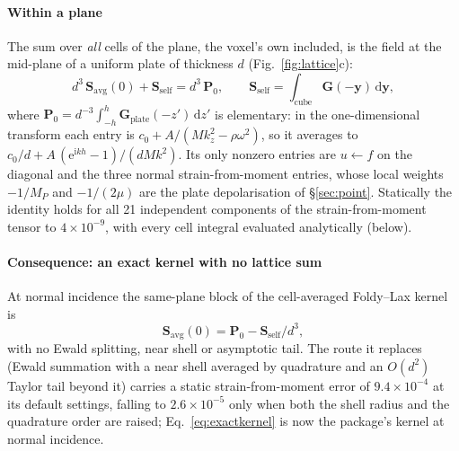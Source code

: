 \documentclass[preprint,review,12pt]{elsarticle}
\newcommand{\bS}{\mathbf{S}}
\newcommand{\bP}{\mathbf{P}}
\newcommand{\bG}{\mathbf{G}}
\newcommand{\dd}{\mathrm{d}}
\begin{document}
\paragraph{Within a plane} The sum over \emph{all} cells of the plane, the voxel's own included,
is the field at the mid-plane of a uniform plate of thickness $d$ (Fig.~\ref{fig:lattice}c):
\begin{equation}\label{eq:tiling}
  d^3\,\bS_{\text{avg}}(0)+\bS_{\text{self}}=d^3\,\bP_0,
  \qquad
  \bS_{\text{self}}=\int_{\text{cube}}\bG(-\mathbf y)\,\dd\mathbf y,
\end{equation}
where $\bP_0=d^{-3}\int_{-h}^{h}\bG_{\text{plate}}(-z')\,\dd z'$ is elementary: in the one-dimensional
transform each entry is $c_0+A/(Mk_z^2-\rho\omega^2)$, so it averages to
$c_0/d+A\,(\mathrm{e}^{\mathrm{i}kh}-1)/(dMk^2)$. Its only nonzero entries are $u\leftarrow f$ on the diagonal and the
three normal strain-from-moment entries, whose local weights $-1/M_P$ and $-1/(2\mu)$ are the plate
depolarisation of \S\ref{sec:point}. Statically the identity holds for all 21 independent components
of the strain-from-moment tensor to $4\times10^{-9}$, with every cell integral evaluated analytically
(below).

\paragraph{Consequence: an exact kernel with no lattice sum} At normal incidence the same-plane
block of the cell-averaged Foldy--Lax kernel is
\begin{equation}\label{eq:exactkernel}
  \bS_{\text{avg}}(0)=\bP_0-\bS_{\text{self}}/d^3 ,
\end{equation}
with no Ewald splitting, near shell or asymptotic tail. The route it replaces (Ewald summation
with a near shell averaged by quadrature and an $O(d^2)$ Taylor tail beyond it) carries a static
strain-from-moment error of $9.4\times10^{-4}$ at its default settings, falling to $2.6\times10^{-5}$
only when both the shell radius and the quadrature order are raised; Eq.~\eqref{eq:exactkernel} is
now the package's kernel at normal incidence.
\end{document}
